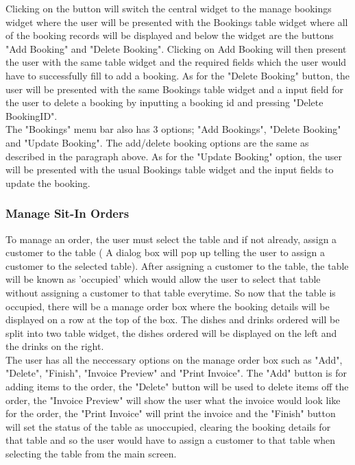 Clicking on the button will switch the central widget to the manage bookings widget where the user will be presented with the Bookings table widget where all of the booking records will be displayed and below the widget are the buttons "Add Booking" and "Delete Booking". Clicking on Add Booking will then present the user with the same table widget and the required fields which the user would have to successfully fill to add a booking. As for the "Delete Booking" button, the user will be presented with the same Bookings table widget and a input field for the user to delete a booking by inputting a booking id and pressing "Delete BookingID". \\

The "Bookings" menu bar also has 3 options; "Add Bookings", "Delete Booking" and "Update Booking". The add/delete booking options are the same as described in the paragraph above. As for the "Update Booking" option, the user will be presented with the usual Bookings table widget and the input fields to update the booking.  

\subsubsection{Manage Sit-In Orders}

To manage an order, the user must select the table and if not already, assign a customer to the table ( A dialog box will pop up telling the user to assign a customer to the selected table). After assigning a customer to the table, the table will be known as 'occupied' which would allow the user to select that table without assigning a customer to that table everytime. So now that the table is occupied, there will be a manage order box where the booking details will be displayed on a row at the top of the box. The dishes and drinks ordered will be split into two table widget, the dishes ordered will be displayed on the left and the drinks on the right. \\

The user has all the neccessary options on the manage order box such as "Add", "Delete", "Finish", "Invoice Preview" and "Print Invoice". The "Add" button is for adding items to the order, the "Delete" button will be used to delete items off the order, the "Invoice Preview" will show the user what the invoice would look like for the order, the "Print Invoice" will print the invoice and the "Finish" button will set the status of the table as unoccupied, clearing the booking details for that table and so the user would have to assign a customer to that table when selecting the table from the main screen.



